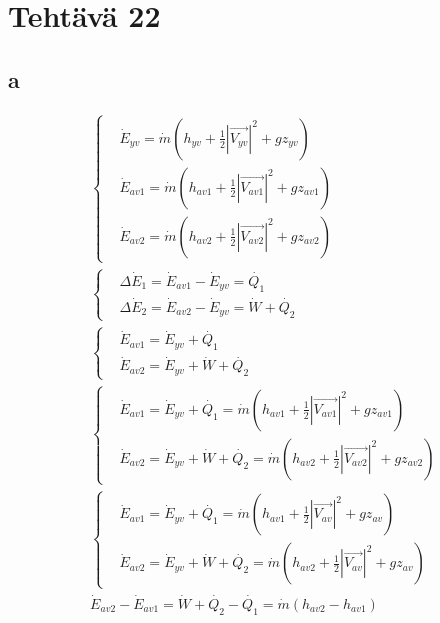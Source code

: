 \documentclass[12pt,a4paper,finnish]{article}
\begin{document}
\section{Tehtävä 22}

\subsection{a}

\begin{align}
 &\left\{
 \begin{aligned}
  &\dot{E}_{yv} = \dot{m}\left(h_{yv} + \frac{1}{2}|\vec{V_{yv}}|^2 + gz_{yv}\right)\\
  &\dot{E}_{av1} = \dot{m}\left(h_{av1} + \frac{1}{2}|\vec{V_{av1}}|^2 + gz_{av1}\right)\\
  &\dot{E}_{av2} = \dot{m}\left(h_{av2} + \frac{1}{2}|\vec{V_{av2}}|^2 + gz_{av2}\right)
 \end{aligned}\right.\\
 &\left\{
 \begin{aligned}
  &\Delta \dot{E}_1 = \dot{E}_{av1} - \dot{E}_{yv} = \dot{Q_1}\\
  &\Delta \dot{E}_2 = \dot{E}_{av2} - \dot{E}_{yv} = \dot{W} + \dot{Q_2}
 \end{aligned}\right.\\
 &\left\{
 \begin{aligned}
  &\dot{E}_{av1} = \dot{E}_{yv} + \dot{Q_1}\\
  &\dot{E}_{av2} = \dot{E}_{yv} + \dot{W} + \dot{Q_2}
 \end{aligned}\right.\\
 &\left\{
 \begin{aligned}
  &\dot{E}_{av1} = \dot{E}_{yv} + \dot{Q_1} = \dot{m}\left(h_{av1} + \frac{1}{2}|\vec{V_{av1}}|^2 + gz_{av1}\right)\\
  &\dot{E}_{av2} = \dot{E}_{yv} + \dot{W} + \dot{Q_2} = \dot{m}\left(h_{av2} + \frac{1}{2}|\vec{V_{av2}}|^2 + gz_{av2}\right)
 \end{aligned}\right.\\
 &\left\{
 \begin{aligned}
  &\dot{E}_{av1} = \dot{E}_{yv} + \dot{Q_1} = \dot{m}\left(h_{av1} + \frac{1}{2}|\vec{V_{av}}|^2 + gz_{av}\right)\\
  &\dot{E}_{av2} = \dot{E}_{yv} + \dot{W} + \dot{Q_2} = \dot{m}\left(h_{av2} + \frac{1}{2}|\vec{V_{av}}|^2 + gz_{av}\right)
 \end{aligned}\right.\\
 &\dot{E}_{av2} - \dot{E}_{av1} = \dot{W} + \dot{Q_2} - \dot{Q_1} = \dot{m}(h_{av2} - h_{av1})
\end{align}
\end{document}
